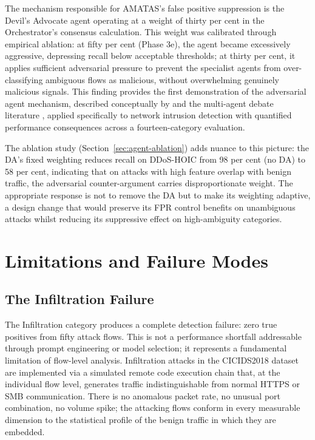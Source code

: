 The mechanism responsible for AMATAS's false positive suppression is the Devil's Advocate agent operating at a weight of thirty per cent in the Orchestrator's consensus calculation. This weight was calibrated through empirical ablation: at fifty per cent (Phase 3e), the agent became excessively aggressive, depressing recall below acceptable thresholds; at thirty per cent, it applies sufficient adversarial pressure to prevent the specialist agents from over-classifying ambiguous flows as malicious, without overwhelming genuinely malicious signals. This finding provides the first demonstration of the adversarial agent mechanism, described conceptually by \textcite{Yin2024} and the multi-agent debate literature \autocite{Du2023, Chan2023}, applied specifically to network intrusion detection with quantified performance consequences across a fourteen-category evaluation.

The ablation study (Section~\ref{sec:agent-ablation}) adds nuance to this picture: the DA's fixed weighting reduces recall on DDoS-HOIC from 98 per cent (no DA) to 58 per cent, indicating that on attacks with high feature overlap with benign traffic, the adversarial counter-argument carries disproportionate weight. The appropriate response is not to remove the DA but to make its weighting adaptive, a design change that would preserve its FPR control benefits on unambiguous attacks whilst reducing its suppressive effect on high-ambiguity categories.

\section{Limitations and Failure Modes}
\label{sec:limitations}

\subsection{The Infiltration Failure}

The Infiltration category produces a complete detection failure: zero true positives from fifty attack flows. This is not a performance shortfall addressable through prompt engineering or model selection; it represents a fundamental limitation of flow-level analysis. Infiltration attacks in the CICIDS2018 dataset are implemented via a simulated remote code execution chain that, at the individual flow level, generates traffic indistinguishable from normal HTTPS or SMB communication. There is no anomalous packet rate, no unusual port combination, no volume spike; the attacking flows conform in every measurable dimension to the statistical profile of the benign traffic in which they are embedded.

